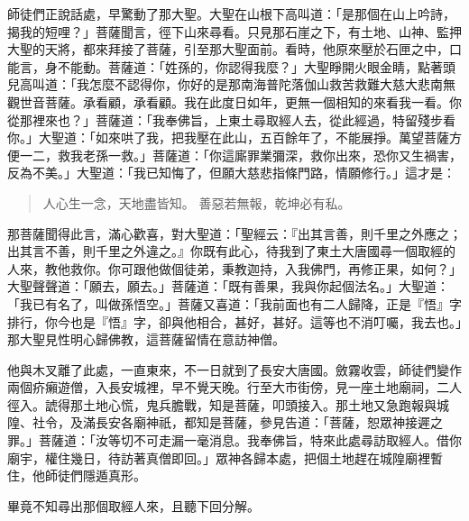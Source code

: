 師徒們正說話處，早驚動了那大聖。大聖在山根下高叫道：「是那個在山上吟詩，揭我的短哩？」菩薩聞言，徑下山來尋看。只見那石崖之下，有土地、山神、監押大聖的天將，都來拜接了菩薩，引至那大聖面前。看時，他原來壓於石匣之中，口能言，身不能動。菩薩道：「姓孫的，你認得我麼？」大聖睜開火眼金睛，點著頭兒高叫道：「我怎麼不認得你，你好的是那南海普陀落伽山救苦救難大慈大悲南無觀世音菩薩。承看顧，承看顧。我在此度日如年，更無一個相知的來看我一看。你從那裡來也？」菩薩道：「我奉佛旨，上東土尋取經人去，從此經過，特留殘步看你。」大聖道：「如來哄了我，把我壓在此山，五百餘年了，不能展掙。萬望菩薩方便一二，救我老孫一救。」菩薩道：「你這廝罪業彌深，救你出來，恐你又生禍害，反為不美。」大聖道：「我已知悔了，但願大慈悲指條門路，情願修行。」這才是：
\begin{quote}
人心生一念，天地盡皆知。
善惡若無報，乾坤必有私。
\end{quote}

那菩薩聞得此言，滿心歡喜，對大聖道：「聖經云：『出其言善，則千里之外應之；出其言不善，則千里之外違之。』你既有此心，待我到了東土大唐國尋一個取經的人來，教他救你。你可跟他做個徒弟，秉教迦持，入我佛門，再修正果，如何？」大聖聲聲道：「願去，願去。」菩薩道：「既有善果，我與你起個法名。」大聖道：「我已有名了，叫做孫悟空。」菩薩又喜道：「我前面也有二人歸降，正是『悟』字排行，你今也是『悟』字，卻與他相合，甚好，甚好。這等也不消叮囑，我去也。」那大聖見性明心歸佛教，這菩薩留情在意訪神僧。

他與木叉離了此處，一直東來，不一日就到了長安大唐國。斂霧收雲，師徒們變作兩個疥癩遊僧，入長安城裡，早不覺天晚。行至大市街傍，見一座土地廟祠，二人徑入。諕得那土地心慌，鬼兵膽戰，知是菩薩，叩頭接入。那土地又急跑報與城隍、社令，及滿長安各廟神祇，都知是菩薩，參見告道：「菩薩，恕眾神接遲之罪。」菩薩道：「汝等切不可走漏一毫消息。我奉佛旨，特來此處尋訪取經人。借你廟宇，權住幾日，待訪著真僧即回。」眾神各歸本處，把個土地趕在城隍廟裡暫住，他師徒們隱遁真形。

畢竟不知尋出那個取經人來，且聽下回分解。

